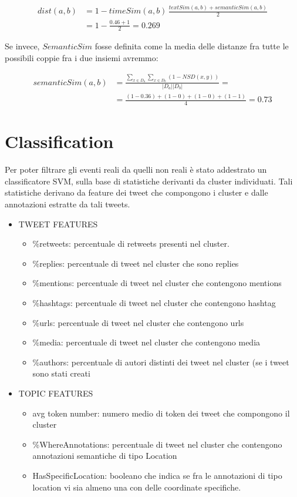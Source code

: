 \documentclass[a4paper,12pt]{report}
\begin{document}
 \begin{align*}
dist(a,b)&=1- timeSim(a,b)\,\frac{textSim(a,b)+semanticSim(a,b)}{2}\\
&=1-\frac{0.46+1}{2}=0.269
\end{align*}

Se invece, $SemanticSim$ fosse definita come la media delle distanze fra tutte le possibili coppie fra i due insiemi avremmo: 

\begin{align*}
	semanticSim(a,b)&=\frac{\sum\limits_{x \in D_a} \sum\limits_{x \in D_b}  (1-NSD(x,y))}{|D_a||D_b|}=\\
	&=\frac{(1-0.36)+(1-0)+(1-0)+(1-1)}{4}=0.73
\end{align*}
  
 
 


\newpage
\section{Classification}
Per poter filtrare gli eventi reali da quelli non reali è stato addestrato un classificatore SVM, sulla base di statistiche derivanti da cluster individuati. Tali statistiche derivano da feature dei tweet che compongono i cluster e dalle annotazioni estratte da tali tweets.
\begin{itemize}
\item TWEET FEATURES
\begin{itemize}
	\item	\%retweets:  percentuale di retweets presenti nel cluster. 
\item	\%replies:      percentuale di tweet nel cluster che sono replies
\item	\%mentions: percentuale di tweet nel cluster che contengono mentions
\item	\%hashtags:  percentuale di tweet nel cluster che contengono hashtag
\item	\%urls: percentuale di tweet nel cluster che contengono urls
\item	\%media: percentuale di tweet nel cluster che contengono media
\item	\%authors: percentuale di autori distinti dei tweet nel cluster (se i tweet sono stati creati 
\end{itemize}
\item TOPIC FEATURES
\begin{itemize}
\item avg token number: numero medio di token dei tweet che compongono il cluster
\item \%WhereAnnotations: percentuale di tweet nel cluster che contengono annotazioni semantiche di tipo Location
\item HasSpecificLocation: booleano che indica se fra le annotazioni di tipo location vi sia almeno una con delle coordinate specifiche.
\end{itemize}
\end{itemize}
\end{document}
